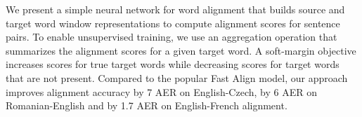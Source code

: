 We present a simple neural network for word alignment that builds source and target word window representations to compute alignment scores for sentence pairs. To enable unsupervised training, we use an aggregation operation that summarizes the alignment scores for a given target word. A soft-margin objective increases scores for true target words while decreasing scores for target words that are not present. Compared to the popular Fast Align model, our approach improves alignment accuracy by 7 AER on English-Czech, by 6 AER on Romanian-English and by 1.7 AER on English-French alignment.
